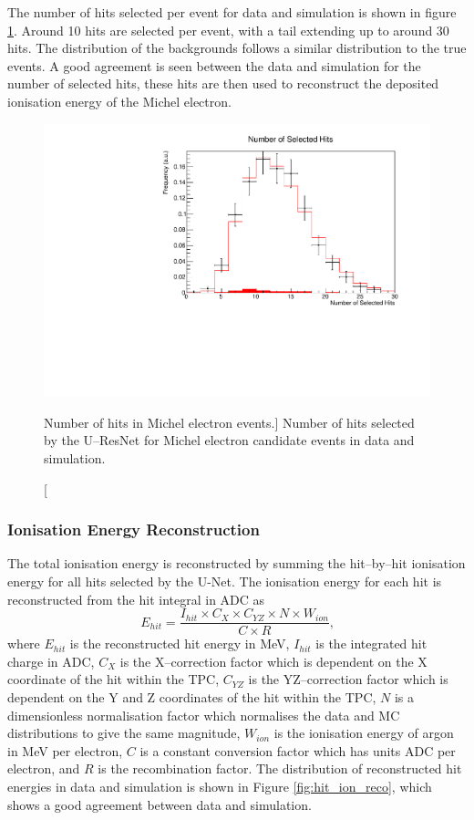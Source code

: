 The number of hits selected per event for data and simulation is shown in 
figure \ref{fig:mich_n_hits}. Around 10 hits are selected per event, with a 
tail extending up to around 30 hits. The distribution of the backgrounds 
follows a similar distribution to the true events. A good agreement is seen 
between the data and simulation for the number of selected hits, these hits 
are then used to reconstruct the deposited ionisation energy of the Michel
electron.
\begin{figure}
	\centering
	\includegraphics[width=\textwidth]{figures/mich_n_hits.pdf}
	\caption
	[Number of hits in Michel electron events.]
	{Number of hits selected by the U--ResNet for Michel electron candidate events in
	data and simulation.}
	\label{fig:mich_n_hits}
\end{figure}

\subsubsection{Ionisation Energy Reconstruction}

The total ionisation energy is reconstructed by summing the hit--by--hit
ionisation energy for all hits selected by the U-Net. The ionisation energy for
each hit is reconstructed from the hit integral in ADC as 
\begin{equation}
	E_{hit} = \frac{I_{hit} \times C_X \times C_{YZ} \times N \times W_{ion}}{C \times R}\mbox{,}
\end{equation}
where $E_{hit}$ is the reconstructed hit energy in MeV, $I_{hit}$ is the
integrated hit charge in ADC, $C_X$ is the X--correction factor which is
dependent on the X coordinate of the hit within the TPC, $C_{YZ}$ is the 
YZ--correction factor which is dependent on the Y and Z coordinates 
of the hit within the TPC, $N$ is a dimensionless normalisation factor which
normalises the data and MC distributions to give the same magnitude, $W_{ion}$
is the ionisation energy of argon in MeV per electron, $C$ is a constant
conversion factor which has units ADC per electron, and $R$ is the
recombination factor. The distribution of reconstructed hit energies in
\protodune{} data and simulation is shown in Figure \ref{fig:hit_ion_reco},
which shows a good agreement between data and simulation.

